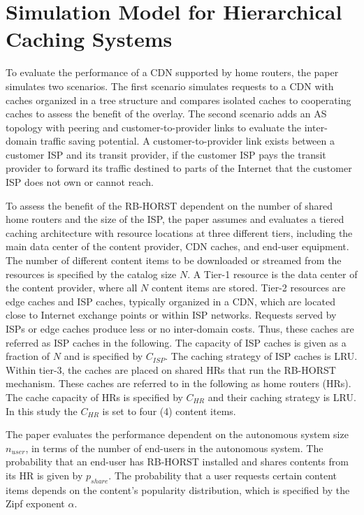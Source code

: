 \section{Simulation Model for Hierarchical Caching Systems}\label{sec:eval}

To evaluate the performance of a CDN supported by home routers, the paper simulates two scenarios. The first scenario simulates requests to a CDN with caches organized in a tree structure and compares isolated caches to cooperating caches to assess the benefit of the overlay.
The second scenario adds an AS topology with peering and customer-to-provider links to evaluate the inter-domain traffic saving potential. A customer-to-provider link exists between a customer ISP and its transit provider, if the customer ISP pays the transit provider to forward its traffic destined to parts of the Internet that the customer ISP does not own or cannot reach.


To assess the benefit of the RB-HORST dependent on the number of shared home routers and the size of the ISP, the paper assumes and evaluates a tiered caching architecture with resource locations at three different tiers, including the main data center of the content provider, CDN caches, and end-user equipment.
The number of different content items to be downloaded or streamed from the resources is specified by the catalog size $N$. A Tier-1 resource is the data center of the content provider, where all $N$ content items are stored. Tier-2 resources are edge caches and ISP caches, typically organized in a CDN, which are located close to Internet exchange points or within ISP networks. Requests served by ISPs or edge caches produce less or no inter-domain costs. Thus, these caches are referred as ISP caches in the following. The capacity of ISP caches is given as a fraction of $N$ and is specified by $C_{ISP}$. The caching strategy of ISP caches is LRU.
Within tier-3, the caches are placed on shared HRs that run the RB-HORST mechanism. These caches are referred to in the following as home routers (HRs). The cache capacity of HRs is specified by $C_{HR}$ and their caching strategy is LRU. In this study the $C_{HR}$ is set to four (4) content items.

The paper evaluates the performance dependent on the autonomous system size $n_{user}$, in terms of the number of end-users in the autonomous system. The probability that an end-user has RB-HORST installed and shares contents from its HR is given by $p_{share}$. The probability that a user requests certain content items depends on the content's popularity distribution, which is specified by the Zipf exponent $\alpha$.
